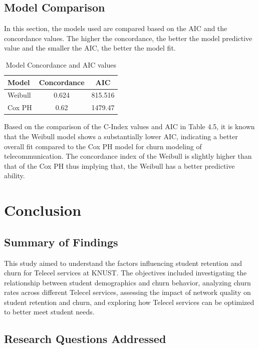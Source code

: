\documentclass[doublespacing]{report} %
\begin{document}
\section{Model Comparison}

In this section, the models used are compared based on the AIC and the concordance values. The higher the concordance, the better the model predictive value and the smaller the AIC, the better the model fit.

\begin{table}[H]
\centering
\begin{tabular}{lcc}
\toprule
\textbf{Model} & \textbf{Concordance} & \textbf{AIC} \\
\midrule
Weibull & 0.624 & 815.516 \\
Cox PH & 0.62 & 1479.47 \\
\bottomrule
\end{tabular}
\caption{Model Concordance and AIC values}
\end{table}

Based on the comparison of the C-Index values and AIC in Table 4.5, it is known that the Weibull model shows a substantially lower AIC, indicating a better overall fit compared to the Cox PH model for churn modeling of telecommunication. The concordance index of the Weibull is slightly higher than that of the Cox PH thus implying that, the Weibull has a better predictive ability.

\newpage
\chapter{Conclusion}

\section{Summary of Findings}

This study aimed to understand the factors influencing student retention and churn for Telecel services at KNUST. The objectives included investigating the relationship between student demographics and churn behavior, analyzing churn rates across different Telecel services, assessing the impact of network quality on student retention and churn, and exploring how Telecel services can be optimized to better meet student needs.

\section{Research Questions Addressed}
\end{document}
